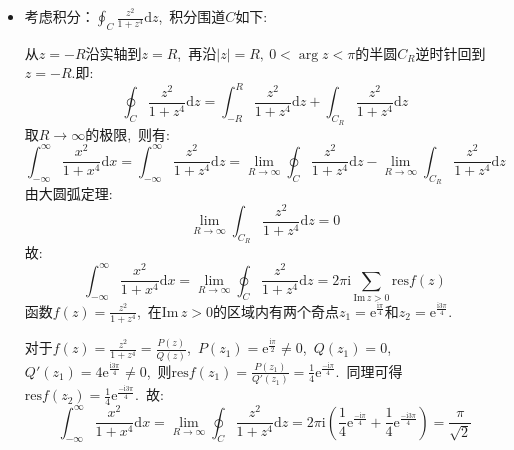 \documentclass[a4paper,fontset=windows]{ctexart}
\begin{document}
\begin{itemize}
在积分围道$|z|=1$内,\ $f(z)$有两个一阶极点$z_1$,\ $z_2$.

对于$z_1=\sqrt{3-2\sqrt2}$,\ $P(z_1)=\sqrt{3-2\sqrt2}\neq0$,\ $Q(z_1)=0$,\ $Q'(z_1)=-8\sqrt2\neq0$,\ 则$\mathrm{res}f(z_1)=\frac{P(z_1)}{Q'(z_1)}=-\frac{1}{8\sqrt{2}}$.\ 同理可得$\mathrm{res}f(z_2)=-\frac{1}{8\sqrt{2}}$.\ 

故:
\begin{align*}
\int_{0}^{\pi}\frac{\mathrm{d}\theta}{1+\sin^2\theta}
&=\frac{1}{2}\int_{0}^{2\pi}\frac{\mathrm{d}\theta}{1+\sin^2\theta} \\
&=\frac{1}{2}\oint_{|z|=1}\frac{4\mathrm{i}z}{z^4-6z+1}\mathrm{d}z \\
&=2\mathrm{i}\oint_{|z|=1}\frac{z}{z^4-6z+1}\mathrm{d}z \\
&=2\mathrm{i}\times 2\pi\mathrm{i}\sum_{|z|<1}\mathrm{res}f(z) \\
&=2\mathrm{i}\times 2\pi\mathrm{i}\left(-\frac{1}{8\sqrt{2}}-\frac{1}{8\sqrt{2}}\right) \\
&=\frac{\pi}{\sqrt2}
\end{align*}

\bigskip
\item[6.(1)]
考虑积分：$\oint_{C}\frac{z^2}{1+z^4}\mathrm{d}z$,\ 积分围道$C$如下:

从$z=-R$沿实轴到$z=R$,\ 再沿$|z|=R,\ 0<\arg z<\pi$的半圆$C_R$逆时针回到$z=-R$.即:
\[
\oint_{C}\frac{z^2}{1+z^4}\mathrm{d}z
=\int_{-R}^{R}\frac{z^2}{1+z^4}\mathrm{d}z+\int_{C_R}\frac{z^2}{1+z^4}\mathrm{d}z
\]
取$R\rightarrow\infty$的极限,\ 则有:
\[
\int_{-\infty}^{\infty}\frac{x^2}{1+x^4}\mathrm{d}x
=\int_{-\infty}^{\infty}\frac{z^2}{1+z^4}\mathrm{d}z
=\lim_{R \to \infty}\oint_{C}\frac{z^2}{1+z^4}\mathrm{d}z-\lim_{R \to \infty}\int_{C_R}\frac{z^2}{1+z^4}\mathrm{d}z
\]
由大圆弧定理:
\[
\lim_{R \to \infty}\int_{C_R}\frac{z^2}{1+z^4}\mathrm{d}z=0
\]
故:
\[
\int_{-\infty}^{\infty}\frac{x^2}{1+x^4}\mathrm{d}x
=\lim_{R \to \infty}\oint_{C}\frac{z^2}{1+z^4}\mathrm{d}z
=2\pi\mathrm{i}\sum_{\mathrm{Im}\,z>0}\mathrm{res}f(z)
\]
函数$f(z)=\frac{z^2}{1+z^4}$,\ 在$\mathrm{Im}\,z>0$的区域内有两个奇点$z_1=\mathrm{e}^{\frac{\mathrm{i}\pi}{4}}$和$z_2=\mathrm{e}^{\frac{\mathrm{i}3\pi}{4}}$.

对于$f(z)=\frac{z^2}{1+z^4}=\frac{P(z)}{Q(z)}$,\ $P(z_1)=\mathrm{e}^{\frac{\mathrm{i}\pi}{2}}\neq0$,\ $Q(z_1)=0$,\ $Q'(z_1)=4\mathrm{e}^{\frac{\mathrm{i}3\pi}{4}}\neq0$,\ 则$\mathrm{res}f(z_1)=\frac{P(z_1)}{Q'(z_1)}=\frac{1}{4}\mathrm{e}^{\frac{-\mathrm{i}\pi}{4}}$.\ 同理可得$\mathrm{res}f(z_2)=\frac{1}{4}\mathrm{e}^{\frac{-\mathrm{i}3\pi}{4}}$.\ 故:
\[
\int_{-\infty}^{\infty}\frac{x^2}{1+x^4}\mathrm{d}x
=\lim_{R \to \infty}\oint_{C}\frac{z^2}{1+z^4}\mathrm{d}z
=2\pi \mathrm{i}\left(\frac{1}{4}\mathrm{e}^{\frac{-\mathrm{i}\pi}{4}}+\frac{1}{4}\mathrm{e}^{\frac{-\mathrm{i}3\pi}{4}}\right)
=\frac{\pi}{\sqrt2}
\]


\end{itemize}
\end{document}
